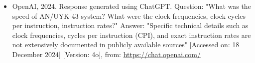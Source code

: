 \documentclass{article}
\begin{document}
\begin{itemize}
\item OpenAI, 2024. Response generated using ChatGPT. Question: "What was the speed of AN/UYK-43 system? What were the clock frequencies, clock cycles per instruction, instruction rates?" Answer: "Specific technical details such as clock frequencies, cycles per instruction (CPI), and exact instruction rates are not extensively documented in publicly available sources" [Accessed on: 18 December 2024] [Version: 4o], from: \url{https://chat.openai.com/}

\end{itemize}
\end{document}
